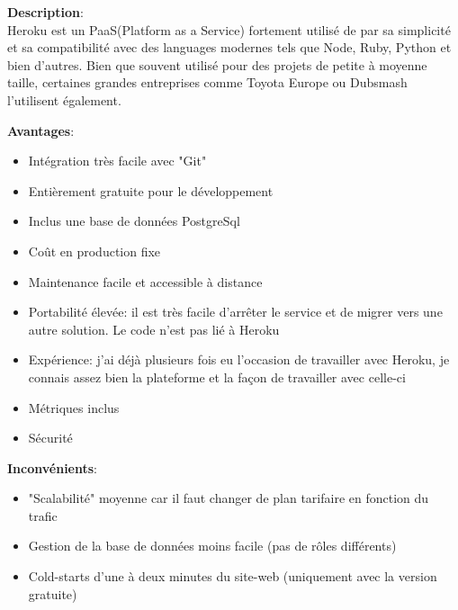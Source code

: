\newpage
{}

\textbf{Description}: \\ Heroku est un PaaS(Platform as a Service) fortement utilisé de par sa simplicité et sa compatibilité avec des languages modernes tels que Node, Ruby, Python et bien d'autres.
\newpara
Bien que souvent utilisé pour des projets de petite à moyenne taille, certaines grandes entreprises comme Toyota Europe ou Dubsmash l'utilisent également.

\newpara
\textbf{Avantages}:
\begin{itemize}
  \item Intégration très facile avec "Git"
  \item Entièrement gratuite pour le développement
  \item Inclus une base de données PostgreSql
  \item Coût en production fixe
  \item Maintenance facile et accessible à distance
  \item Portabilité élevée: il est très facile d'arrêter le service et de migrer vers une autre solution. Le code n'est pas lié à Heroku
  \item Expérience: j'ai déjà plusieurs fois eu l'occasion de travailler avec Heroku, je connais assez bien la plateforme et la façon de travailler avec celle-ci
  \item Métriques inclus
  \item Sécurité  
\end{itemize}

\newpara
\textbf{Inconvénients}:
\begin{itemize}
  \item "Scalabilité" moyenne car il faut changer de plan tarifaire en fonction du trafic
  \item Gestion de la base de données moins facile (pas de rôles différents)
  \item Cold-starts d'une à deux minutes du site-web (uniquement avec la version gratuite)
\end{itemize}

